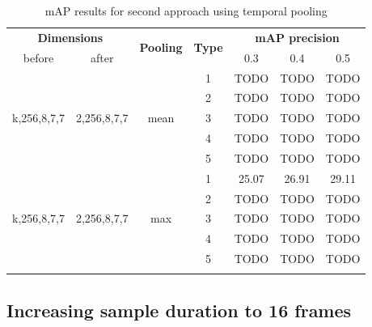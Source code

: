 \documentclass{report}
\begin{document}
\begin{center}
\begin{longtable}{||c | c| c| c||c c c||}

  \hline
 \multicolumn{2}{||c|}{\textbf{Dimensions}} & \multirow{2}{*}{\textbf{Pooling}} &\multirow{2}{*}{ \textbf{Type}} &\multicolumn{3}{|c||}{\textbf{mAP precision}}\\

  before & after & {} & {} & 0.3 &  0.4 & 0.5 \\
  \hline   \hline

  \multirow{5}{*}{k,256,8,7,7} & \multirow{5}{*}{2,256,8,7,7} & \multirow{5}{*}{mean}  & 1 & TODO & TODO & TODO \\
  \cline{4-7}

  {} & {} & {} & 2 & TODO & TODO & TODO \\
  \cline{4-7}
  {} & {} & {} & 3 & TODO & TODO & TODO \\
  \cline{4-7}
  {} & {} & {} & 4 & TODO & TODO & TODO \\
  \cline{4-7}
  {} & {} & {} & 5 & TODO & TODO & TODO \\
  \hline

  \multirow{5}{*}{k,256,8,7,7} & \multirow{5}{*}{2,256,8,7,7} & \multirow{5}{*}{max}  & 1 & 25.07 & 26.91 & 29.11 \\
  \cline{4-7}

  {} & {} & {} & 2 & TODO & TODO & TODO \\
  \cline{4-7}
  {} & {} & {} & 3 & TODO & TODO & TODO \\
  \cline{4-7}
  {} & {} & {} & 4 & TODO & TODO & TODO \\
  \cline{4-7}
  {} & {} & {} & 5 & TODO & TODO & TODO \\
  \hline

  \caption{mAP results for second approach using temporal pooling }
  \label{table:svm_temp_pooling}
\end{longtable} 
\end{center}

\subsection{Increasing sample duration to 16 frames}
\end{document}
